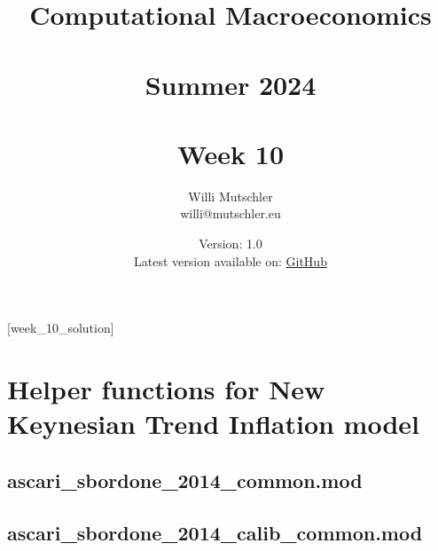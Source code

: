 
\newif\ifDisplaySolutions%


\title{Computational Macroeconomics\\~\\Summer 2024\\~\\Week 10}
\author{Willi Mutschler\\willi@mutschler.eu}
\date{Version: 1.0\\Latest version available on: \href{https://github.com/wmutschl/Computational-Macroeconomics/releases/latest/download/week_10.pdf}{GitHub}}
\maketitle\thispagestyle{empty}

\newpage
{}[week_10_solution]
\tableofcontents\thispagestyle{empty}\newpage

\setcounter{page}{1}
\newpage
\newpage
\newpage

\printbibliography%

\newpage

\appendix

\section{Helper functions for New Keynesian Trend Inflation model}

\subsection{ascari\_sbordone\_2014\_common.mod\label{app:ascari_sbordone_2014_common}}


\subsection{ascari\_sbordone\_2014\_calib\_common.mod\label{app:ascari_sbordone_2014_calib_common}}


\ifDisplaySolutions%
\newpage
\appendix
\section{Solutions}

\fi
